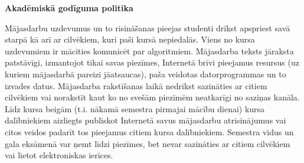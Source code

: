 \documentclass[11pt]{article}
\begin{document}
\vspace{10pt}
{\large \bf Akadēmiskā godīguma politika}

Mājasdarbu uzdevumus un to risināšanas pieejas studenti drīkst apspriest savā starpā 
kā arī ar cilvēkiem, kuri paši kursā nepiedalās. Viens no kursa uzdevumiem ir 
mācīties komunicēt par algoritmiem.
Mājasdarba teksts jāraksta patstāvīgi, izmantojot tikai savas piezīmes, 
Internetā brīvi pieejamus resursus (uz kuriem mājasdarbā pareizi jāatsaucas), 
paša veidotas datorprogrammas un to izvades datus. Mājasdarba rakstīšanas laikā 
nedrīkst sazināties ar citiem cilvēkiem vai norakstīt kaut ko no svešām 
piezīmēm neatkarīgi no saziņas kanāla. Līdz kursa beigām (t.i. nākamā 
semestra pirmajai mācību dienai) kursa dalībniekiem aizliegts publiskot 
Internetā savus mājasdarbu atrisinājumus vai citos veidos padarīt 
tos pieejamus citiem kursa dalībniekiem.
Semestra vidus un gala eksāmenā var ņemt līdzi piezīmes, bet nevar sazināties 
ar citiem cilvēkiem vai lietot elektroniskas ierīces.
\end{document}

